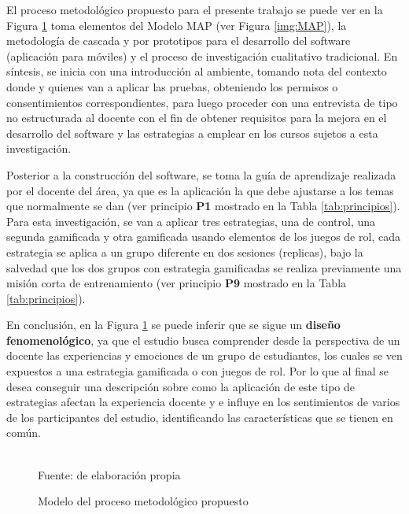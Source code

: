 El proceso metodológico propuesto para el presente trabajo se puede ver en la Figura \ref{img:metodologia} 
toma elementos del Modelo MAP (ver Figura \ref{img:MAP}), la metodología de cascada y por prototipos para el 
desarrollo del software (aplicación para móviles) y el proceso de investigación cualitativo tradicional. En 
síntesis, se inicia con una introducción al ambiente, tomando nota del contexto donde y quienes van a aplicar 
las pruebas, obteniendo los permisos o consentimientos correspondientes, para luego proceder con una 
entrevista de tipo no estructurada al docente con el fin de obtener requisitos para la mejora en el desarrollo 
del software y las estrategias a emplear en los cursos sujetos a esta investigación.

Posterior a la construcción del software, se toma la guía de aprendizaje realizada por el docente del área,
ya que es la aplicación la que debe ajustarse a los temas que normalmente se dan (ver principio \textbf{P1} 
mostrado en la Tabla \ref{tab:principios}). Para esta investigación, se van a aplicar tres estrategias, una de
control, una segunda gamificada y otra gamificada usando elementos de los juegos de rol, cada estrategia se
aplica a un grupo diferente en dos sesiones (replicas), bajo la salvedad que los dos grupos con estrategia 
gamificadas se realiza previamente una misión corta de entrenamiento (ver principio \textbf{P9} mostrado en la 
Tabla \ref{tab:principios}).

En conclusión, en la Figura \ref{img:metodologia} se puede inferir que se sigue un \textbf{diseño 
fenomenológico}, ya que el estudio busca comprender desde la perspectiva de un docente las experiencias y 
emociones de un grupo de estudiantes, los cuales se ven expuestos a una estrategia gamificada o con juegos de 
rol. Por lo que al final se desea conseguir una descripción sobre como la aplicación de este tipo de 
estrategias afectan la experiencia docente y e influye en los sentimientos de varios de los participantes del 
estudio, identificando las características que se tienen en común.

\begin{figure}[htp]
\caption{Modelo del proceso metodológico propuesto}
\label{img:metodologia}
\centering

\\
{\footnotesize Fuente: de elaboración propia}
\end{figure}
